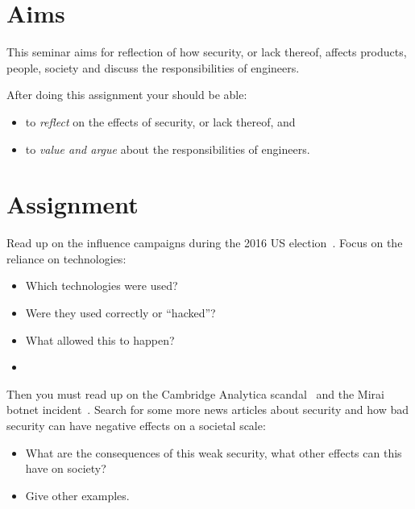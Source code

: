 \section{Aims}

This seminar aims for reflection of how security, or lack thereof, affects 
products, people, society and discuss the responsibilities of engineers.
\begin{frame}
After doing this assignment your should be able:
\begin{itemize}
  \item to \emph{reflect} on the effects of security, or lack thereof, and
  \item to \emph{value and argue} about the responsibilities of engineers.
\end{itemize}
\end{frame}


\section{Assignment}%
\label{sec:Tasks}

Read up on the influence campaigns during the 2016 US 
election~\cite{inside-russian-influence-campaign}.
Focus on the reliance on technologies:
\begin{frame}
\begin{itemize}
  \item Which technologies were used?
  \item Were they used correctly or \enquote{hacked}?
  \item What allowed this to happen?
  \item \Etc
\end{itemize}
\end{frame}

Then you must read up on the Cambridge Analytica scandal~\cite[\eg][]{%
  wired-cambridge-analytica,
  guardian-cambridge-analytica,
  nytimes-cambridge-analytica,
  wp-cambridge-analytica,
} and the Mirai botnet incident~\cite{schneier-mirai}.
Search for some more news articles about security and how bad security can have 
negative effects on a societal scale:
\begin{frame}
\begin{itemize}
  \item What are the consequences of this weak security, what other effects can 
    this have on society?
  \item Give other examples.
\end{itemize}
\end{frame}

